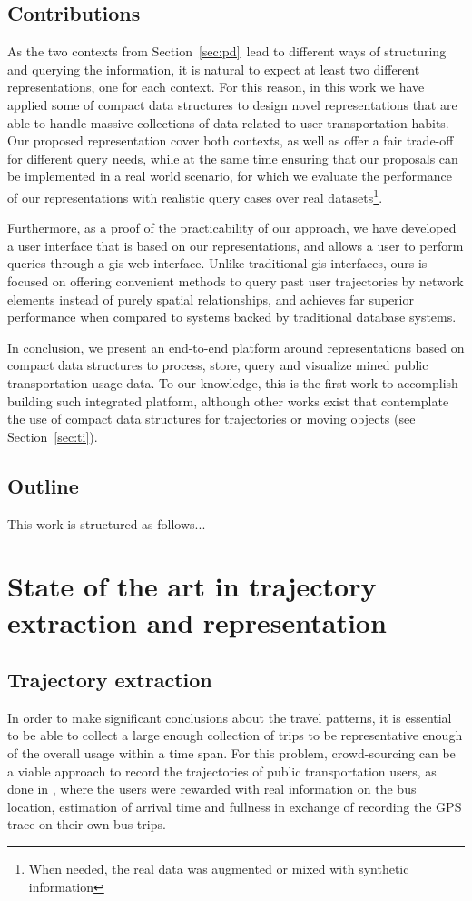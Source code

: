 \documentclass[a4paper,10pt,twoside]{book}
\begin{document}
	\section{Contributions}
	As the two contexts from Section~\ref{sec:pd}~lead to different ways of structuring and querying the information, it is natural to expect at least two different representations, one for each context. For this reason, in this work we have applied some of compact data structures to design novel representations that are able to handle massive collections of data related to user transportation habits. Our proposed representation cover both contexts, as well as offer a fair trade-off for different query needs, while at the same time ensuring that our proposals can be implemented in a real world scenario, for which we evaluate the performance of our representations with realistic query cases over real datasets\footnote{When needed, the real data was augmented or mixed with synthetic information}.
	
	Furthermore, as a proof of the practicability of our approach, we have developed a user interface that is based on our representations, and allows a user to perform queries through a \gls{gis} web interface. Unlike traditional \gls{gis} interfaces, ours is focused on offering convenient methods to query past user trajectories by network elements instead of purely spatial relationships, and achieves far superior performance when compared to systems backed by traditional database systems.
	
	In conclusion, we present an end-to-end platform around representations based on compact data structures to process, store, query and visualize mined public transportation usage data. To our knowledge, this is the first work to accomplish building such integrated platform, although other works exist that contemplate the use of compact data structures for trajectories or moving objects (see Section~\ref{sec:ti}).
	
	\section{Outline}
	This work is structured as follows...
	
\chapter{State of the art in trajectory extraction and representation}
	\section{Trajectory extraction}
	\label{sec:dm}
	In order to make significant conclusions about the travel patterns, it is essential to be able to collect a large enough collection of trips to be representative enough of the overall usage within a time span. For this problem, crowd-sourcing can be a viable approach to record the trajectories of public transportation users, as done in \cite{zimmerman2011field}, where the users were rewarded with real information on the bus location, estimation of arrival time and fullness in exchange of recording the GPS trace on their own bus trips.
	
\end{document}
